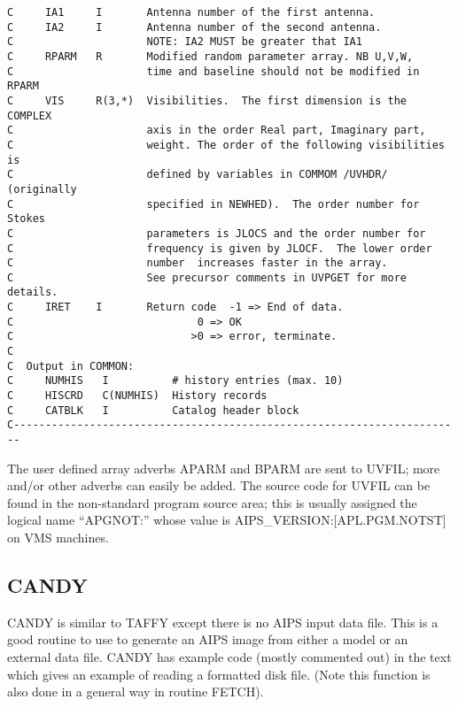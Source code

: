 \begin{verbatim}
C     IA1     I       Antenna number of the first antenna.
C     IA2     I       Antenna number of the second antenna.
C                     NOTE: IA2 MUST be greater that IA1
C     RPARM   R       Modified random parameter array. NB U,V,W,
C                     time and baseline should not be modified in RPARM
C     VIS     R(3,*)  Visibilities.  The first dimension is the COMPLEX
C                     axis in the order Real part, Imaginary part,
C                     weight. The order of the following visibilities is
C                     defined by variables in COMMOM /UVHDR/ (originally
C                     specified in NEWHED).  The order number for Stokes
C                     parameters is JLOCS and the order number for
C                     frequency is given by JLOCF.  The lower order
C                     number  increases faster in the array.
C                     See precursor comments in UVPGET for more details.
C     IRET    I       Return code  -1 => End of data.
C                             0 => OK
C                            >0 => error, terminate.
C
C  Output in COMMON:
C     NUMHIS   I          # history entries (max. 10)
C     HISCRD   C(NUMHIS)  History records
C     CATBLK   I          Catalog header block
C-----------------------------------------------------------------------

\end{verbatim}
 The user defined array adverbs APARM and BPARM are sent to UVFIL;
more and/or other adverbs can easily be added. The source code for
UVFIL can be found in the non-standard program source area; this is
usually assigned the logical name ``APGNOT:'' whose value is
AIPS\_VERSION:[APL.PGM.NOTST] on VMS machines.

\subsection{CANDY}
 CANDY is similar to TAFFY except there is no AIPS input data file.
This is a good routine to use to generate an AIPS image from either a
model or an external data file.  CANDY has example code (mostly
commented out) in the text which gives an example of reading a
formatted disk file.  (Note this function is also done in a general
way in routine FETCH).


